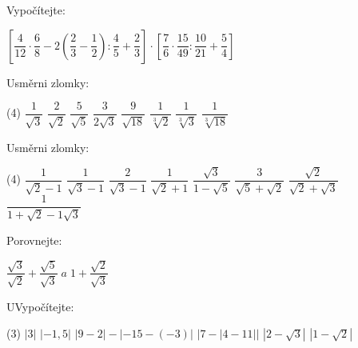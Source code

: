 \documentclass[12pt,a4paper]{article}
\begin{document}
\begin{exercise}
    Vypočítejte:
    \begin{tasks}
        \task $\left[\dfrac{4}{12}\cdot\dfrac{6}{8}-2\left(\dfrac{2}{3}-\dfrac{1}{2}\right):\dfrac{4}{5}+\dfrac{2}{3} \right]\cdot\left[\dfrac{7}{6}\cdot\dfrac{15}{49}:\dfrac{10}{21}+\dfrac{5}{4}\right]$
    \end{tasks}
\end{exercise}

\setcounter{section}{4}

\begin{exercise}
    Usměrni zlomky:
    \begin{tasks}(4)
        \task $\dfrac{1}{\sqrt{3}}$
        \task $\dfrac{2}{\sqrt{2}}$
        \task $\dfrac{5}{\sqrt{5}}$
        \task $\dfrac{3}{2\sqrt{3}}$
        \task $\dfrac{9}{\sqrt{18}}$
        \task $\dfrac{1}{\sqrt[3]{2}}$
        \task $\dfrac{1}{\sqrt[3]{3}}$
        \task $\dfrac{1}{\sqrt[3]{18}}$
    \end{tasks}
\end{exercise}

\begin{exercise}
    Usměrni zlomky:
    \begin{tasks}(4)
        \task $\dfrac{1}{\sqrt{2}-1}$
        \task $\dfrac{1}{\sqrt{3}-1}$
        \task $\dfrac{2}{\sqrt{3}-1}$
        \task $\dfrac{1}{\sqrt{2}+1}$
        \task $\dfrac{\sqrt{3}}{1-\sqrt{5}}$
        \task $\dfrac{3}{\sqrt{5}+\sqrt{2}}$
        \task $\dfrac{\sqrt{2}}{\sqrt{2}+\sqrt{3}}$
        \task $\dfrac{1}{1+\sqrt{2}-1\sqrt{3}}$
    \end{tasks}
\end{exercise}

\begin{exercise}
    Porovnejte:
    \begin{tasks}
        \task $\dfrac{\sqrt{3}}{\sqrt{2}} + \dfrac{\sqrt{5}}{\sqrt{3}} \;  a \; 1 + \dfrac{\sqrt{2}}{\sqrt{3}}$
    \end{tasks}
\end{exercise}
\setcounter{section}{5}

\begin{exercise}
    UVypočítejte:
    \begin{tasks}(3)
        \task $\left\lvert 3\right\rvert$
        \task $\left\lvert -1,5\right\rvert$
        \task $\left\lvert 9-2\right\rvert-\left\lvert -15-(-3)\right\rvert$
        \task $\left\lvert 7-\left\lvert 4-11\right\rvert\right\rvert$
        \task $\left\lvert 2-\sqrt{3}\right\rvert$
        \task $\left\lvert 1-\sqrt{2}\right\rvert$
    \end{tasks}
\end{exercise}
\end{document}
